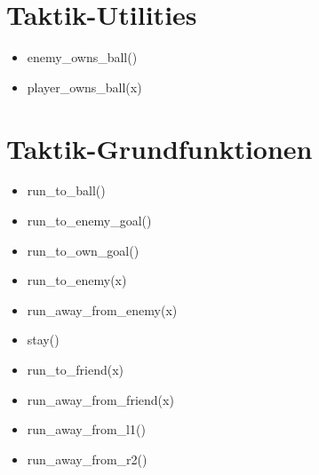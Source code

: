 \section{Taktik-Utilities}
\begin{itemize}
\item  enemy\_owns\_ball()
\item  player\_owns\_ball(x)
\end{itemize}
\section{Taktik-Grundfunktionen}
\begin{itemize}
\item  run\_to\_ball()
\item  run\_to\_enemy\_goal()
\item  run\_to\_own\_goal()
\end{itemize}
\begin{itemize}
\item  run\_to\_enemy(x)
\item  run\_away\_from\_enemy(x)
\end{itemize}
\begin{itemize}
\item  stay()
\end{itemize}
\begin{itemize}
\item  run\_to\_friend(x)
\item  run\_away\_from\_friend(x)
\end{itemize}
\begin{itemize}
\item  run\_away\_from\_l1()
\item  run\_away\_from\_r2()
\end{itemize}

